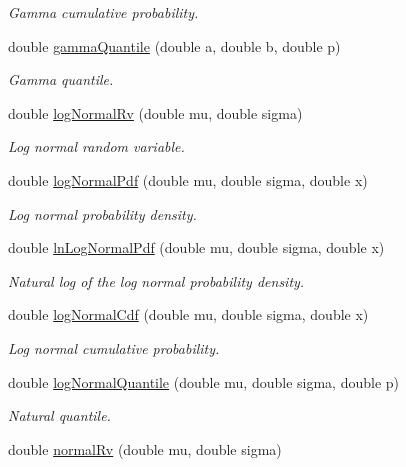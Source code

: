 \begin{DoxyCompactItemize}
\begin{DoxyCompactList}\small\item\em Gamma cumulative probability. \end{DoxyCompactList}\item 
double \mbox{\hyperlink{class_mb_random_a86ea5b619fe0646d64a55c043e9655e0}{gamma\+Quantile}} (double a, double b, double p)
\begin{DoxyCompactList}\small\item\em Gamma quantile. \end{DoxyCompactList}\item 
double \mbox{\hyperlink{class_mb_random_a00b39bcea83dab8c487abf7653b3d917}{log\+Normal\+Rv}} (double mu, double sigma)
\begin{DoxyCompactList}\small\item\em Log normal random variable. \end{DoxyCompactList}\item 
double \mbox{\hyperlink{class_mb_random_a86c722ab7cde1304040f6ec60cb0e66a}{log\+Normal\+Pdf}} (double mu, double sigma, double x)
\begin{DoxyCompactList}\small\item\em Log normal probability density. \end{DoxyCompactList}\item 
double \mbox{\hyperlink{class_mb_random_ae5f654e3f6e19e5d783b894418cac720}{ln\+Log\+Normal\+Pdf}} (double mu, double sigma, double x)
\begin{DoxyCompactList}\small\item\em Natural log of the log normal probability density. \end{DoxyCompactList}\item 
double \mbox{\hyperlink{class_mb_random_a63f5082668019288ec45debb0404bfb6}{log\+Normal\+Cdf}} (double mu, double sigma, double x)
\begin{DoxyCompactList}\small\item\em Log normal cumulative probability. \end{DoxyCompactList}\item 
double \mbox{\hyperlink{class_mb_random_a2d1ef18aad6db3a05838c977d0a0a07a}{log\+Normal\+Quantile}} (double mu, double sigma, double p)
\begin{DoxyCompactList}\small\item\em Natural quantile. \end{DoxyCompactList}\item 
double \mbox{\hyperlink{class_mb_random_ae0e340dd8f57f26a6b4cba0fa9b0fafc}{normal\+Rv}} (double mu, double sigma)

\end{DoxyCompactItemize}
